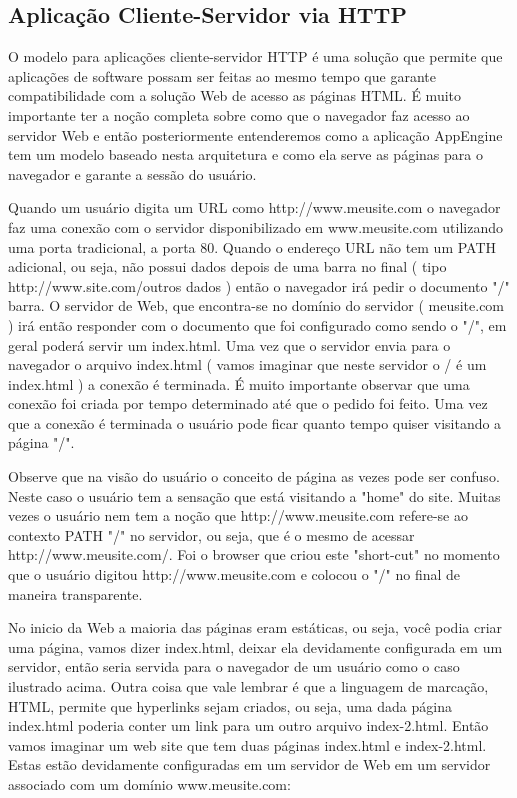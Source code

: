 \documentclass[a4paper]{article}
\begin{document}
 

\subsection {Aplicação Cliente-Servidor via HTTP} 

O modelo para aplicações cliente-servidor HTTP é uma solução que permite que aplicações de software possam ser feitas ao mesmo tempo que garante compatibilidade com a solução Web de acesso as páginas HTML. É muito importante ter a noção completa sobre como que o navegador faz acesso ao servidor Web e então posteriormente entenderemos como a aplicação AppEngine tem um modelo baseado nesta arquitetura e como ela serve as páginas para o navegador e garante a sessão do usuário.  

Quando um usuário digita um URL como http://www.meusite.com o navegador faz uma conexão com o servidor disponibilizado em www.meusite.com utilizando uma porta tradicional, a porta 80. Quando o endereço URL não tem um PATH adicional, ou seja, não possui dados depois de uma barra no final ( tipo http://www.site.com/outros dados ) então o navegador irá pedir o documento "/" barra. O servidor de Web, que encontra-se no domínio do servidor ( meusite.com ) irá então responder com o documento que foi configurado como sendo o "/", em geral poderá servir um index.html. Uma vez que o servidor envia para o navegador o arquivo index.html ( vamos imaginar que neste servidor o / é um index.html ) a conexão é terminada. É muito importante observar que uma conexão foi criada por tempo determinado até que o pedido foi feito. Uma vez que a conexão é terminada o usuário pode ficar quanto tempo quiser visitando a página "/". 

Observe que na visão do usuário o conceito de página as vezes pode ser confuso. Neste caso o usuário tem a sensação que está visitando a "home" do site. Muitas vezes o usuário nem tem a noção que http://www.meusite.com refere-se ao contexto PATH "/" no servidor, ou seja, que é o mesmo de acessar http://www.meusite.com/. Foi o browser que criou este "short-cut" no momento que o usuário digitou http://www.meusite.com e colocou o "/" no final de maneira transparente. 

No inicio da Web a maioria das páginas eram estáticas, ou seja, você podia criar uma página, vamos dizer index.html, deixar ela devidamente configurada em um servidor, então seria servida para o navegador de um usuário como o caso ilustrado acima. Outra coisa que vale lembrar é que a linguagem de marcação, HTML, permite que hyperlinks sejam criados, ou seja, uma dada página index.html poderia conter um link para um outro arquivo index-2.html. Então vamos imaginar um web site que tem duas páginas index.html e index-2.html. Estas estão devidamente configuradas em um servidor de Web em um servidor associado com um domínio www.meusite.com: 
\end{document}
